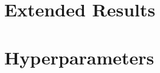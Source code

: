 %

\section{Extended Results}
\label{app:extended_results}


\section{Hyperparameters}
\label{app:hparams}

